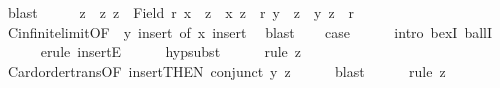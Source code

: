 \begin{isabellebody}
\ blast\isanewline
\ \ \isamarkupfalse%
\ \isamarkupfalse%
\ z\ \ z{\isacharcolon}{\kern0pt}\ {\isachardoublequoteopen}z\ {\isasymin}\ Field\ r{\isachardoublequoteclose}\ {\isachardoublequoteopen}x\ {\isasymnoteq}\ z\ {\isasymand}\ {\isacharparenleft}{\kern0pt}x{\isacharcomma}{\kern0pt}\ z{\isacharparenright}{\kern0pt}\ {\isasymin}\ r{\isachardoublequoteclose}\ {\isachardoublequoteopen}y\ {\isasymnoteq}\ z\ {\isasymand}\ {\isacharparenleft}{\kern0pt}y{\isacharcomma}{\kern0pt}\ z{\isacharparenright}{\kern0pt}\ {\isasymin}\ r{\isachardoublequoteclose}\isanewline
\ \ \ \ \isamarkupfalse%
\ Cinfinite{\isacharunderscore}{\kern0pt}limit{}{\isacharbrackleft}{\kern0pt}OF\ {\isacharunderscore}{\kern0pt}\ y{\isacharparenleft}{\kern0pt}{}{\isacharparenright}{\kern0pt}\ insert{\isacharparenleft}{\kern0pt}{}{\isacharparenright}{\kern0pt}{\isacharcomma}{\kern0pt}\ of\ x{\isacharbrackright}{\kern0pt}\ insert{\isacharparenleft}{\kern0pt}{}{\isacharparenright}{\kern0pt}\ \isamarkupfalse%
\ blast\isanewline
\ \ \isamarkupfalse%
\ {\isacharquery}{\kern0pt}case\isanewline
\ \ \ \ \isamarkupfalse%
\ {\isacharparenleft}{\kern0pt}intro\ bexI\ ballI{\isacharparenright}{\kern0pt}\isanewline
\ \ \ \ \isamarkupfalse%
\ {\isacharparenleft}{\kern0pt}erule\ insertE{\isacharparenright}{\kern0pt}\isanewline
\ \ \ \ \isamarkupfalse%
\ hypsubst\isanewline
\ \ \ \ \isamarkupfalse%
\ {\isacharparenleft}{\kern0pt}rule\ z{\isacharparenleft}{\kern0pt}{}{\isacharparenright}{\kern0pt}{\isacharparenright}{\kern0pt}\isanewline
\ \ \ \ \isamarkupfalse%
\ Card{\isacharunderscore}{\kern0pt}order{\isacharunderscore}{\kern0pt}trans{\isacharbrackleft}{\kern0pt}OF\ insert{\isacharparenleft}{\kern0pt}{}{\isacharparenright}{\kern0pt}{\isacharbrackleft}{\kern0pt}THEN\ conjunct{}{\isacharbrackright}{\kern0pt}{\isacharbrackright}{\kern0pt}\ y{\isacharparenleft}{\kern0pt}{}{\isacharparenright}{\kern0pt}\ z{\isacharparenleft}{\kern0pt}{}{\isacharparenright}{\kern0pt}\isanewline
\ \ \ \ \isamarkupfalse%
\ blast\isanewline
\ \ \ \ \isamarkupfalse%
\ {\isacharparenleft}{\kern0pt}rule\ z{\isacharparenleft}{\kern0pt}{}{\isacharparenright}{\kern0pt}{\isacharparenright}{\kern0pt}\isanewline
\ \ \ \ \isamarkupfalse%
\isanewline
{}\isamarkupfalse%

\end{isabellebody}

